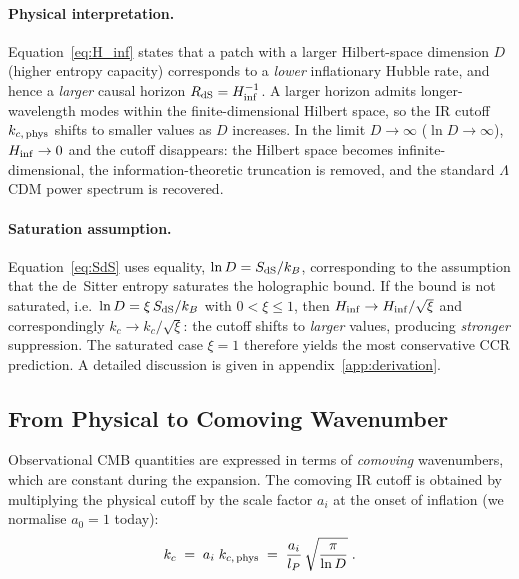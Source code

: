 \paragraph{Physical interpretation.}
Equation~\eqref{eq:H_inf} states that a patch with a larger Hilbert-space
dimension $D$ (higher entropy capacity) corresponds to a \emph{lower}
inflationary Hubble rate, and hence a \emph{larger} causal horizon
$R_{\rm dS} = H_{\rm inf}^{-1}$.
A larger horizon admits longer-wavelength modes within the finite-dimensional
Hilbert space, so the IR cutoff $k_{c,\,\rm phys}$ shifts to smaller values
as $D$ increases.
In the limit $D \to \infty$ ($\ln D \to \infty$), $H_{\rm inf} \to 0$ and the
cutoff disappears: the Hilbert space becomes infinite-dimensional, the
information-theoretic truncation is removed, and the standard $\Lambda$CDM
power spectrum is recovered.
%
\paragraph{Saturation assumption.}
Equation~\eqref{eq:SdS} uses equality,
$\ln D = S_{\rm dS}/k_B$, corresponding to the assumption that the
de~Sitter entropy saturates the holographic bound.  If the bound is not
saturated, i.e.\ $\ln D = \xi\,S_{\rm dS}/k_B$ with $0 < \xi \leq 1$,
then $H_{\rm inf} \to H_{\rm inf}/\sqrt{\xi}$ and correspondingly
$k_c \to k_c/\sqrt{\xi}$: the cutoff shifts to \emph{larger} values,
producing \emph{stronger} suppression.  The saturated case $\xi = 1$
therefore yields the most conservative CCR prediction.  A detailed
discussion is given in appendix~\ref{app:derivation}.

\subsection{From Physical to Comoving Wavenumber}
\label{subsec:comoving}

Observational CMB quantities are expressed in terms of \emph{comoving}
wavenumbers, which are constant during the expansion. The comoving IR cutoff
is obtained by multiplying the physical cutoff by the scale factor $a_i$ at the
onset of inflation (we normalise $a_0 = 1$ today):
%
\begin{equation}
  k_c \;=\; a_i\; k_{c,\,\rm phys} \;=\; \frac{a_i}{l_P}\,\sqrt{\frac{\pi}{\ln D}} \;.
  \label{eq:kc_comoving}
\end{equation}

